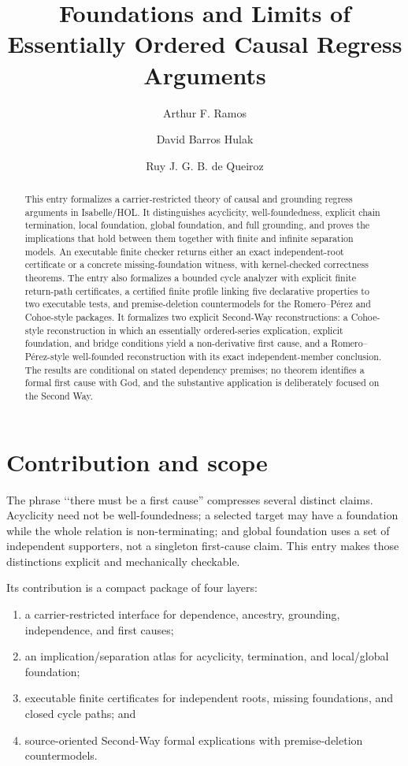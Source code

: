 \documentclass[11pt,a4paper]{article}
\begin{document}
\title{Foundations and Limits of Essentially Ordered Causal Regress Arguments}
\author{Arthur F. Ramos \and David Barros Hulak \and Ruy J. G. B. de Queiroz}
\maketitle

\begin{abstract}
This entry formalizes a carrier-restricted theory of causal and grounding
regress arguments in Isabelle/HOL.  It distinguishes acyclicity,
well-foundedness, explicit chain termination, local foundation, global
foundation, and full grounding, and proves the implications that hold between
them together with finite and infinite separation models.  An executable finite
checker returns either an exact independent-root certificate or a concrete
missing-foundation witness, with kernel-checked correctness theorems.  The
entry also formalizes a bounded cycle analyzer with explicit finite return-path
certificates,
a certified finite profile linking five declarative properties to two executable
tests, and premise-deletion countermodels
for the Romero--Pérez and Cohoe-style packages.  It formalizes two explicit
Second-Way reconstructions: a Cohoe-style reconstruction in which an
essentially ordered-series explication, explicit foundation, and bridge
conditions yield a non-derivative first cause, and a Romero--Pérez-style
  well-founded reconstruction with its exact independent-member conclusion.  The
  results are conditional on stated dependency premises; no theorem identifies a
  formal first cause with God, and the substantive application is deliberately
  focused on the Second Way.
\end{abstract}

\section{Contribution and scope}

The phrase \lq\lq there must be a first cause'' compresses several distinct
claims.  Acyclicity need not be well-foundedness; a selected target may have a
foundation while the whole relation is non-terminating; and global foundation
uses a set of independent supporters, not a singleton first-cause claim.  This
entry makes those distinctions explicit and mechanically checkable.

Its contribution is a compact package of four layers:

\begin{enumerate}
\item a carrier-restricted interface for dependence, ancestry, grounding,
  independence, and first causes;
\item an implication/separation atlas for acyclicity, termination, and
  local/global foundation;
\item executable finite certificates for independent roots, missing
  foundations, and closed cycle paths; and
\item source-oriented Second-Way formal explications with premise-deletion
  countermodels.
\end{enumerate}
\end{document}
